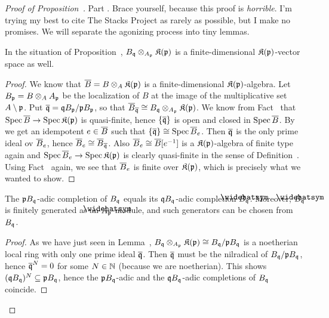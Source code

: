 \documentclass[a4paper,parskip=half,numbers=enddot, DIV=12]{scrreprt}
\begin{document}
\begin{proof}[Proof of Proposition~]
	Part . Brace yourself, because this proof is \emph{horrible}. I'm trying my best to cite The Stacks Project as rarely as possible, but I make no promises. We will separate the agonizing process into tiny lemmas.
	\begin{lem}
		In the situation of Proposition~, $B_{\mathfrak{q}}\otimes_{A_{\mathfrak{p}}}\mathfrak{K}(\mathfrak{p})$ is a finite-dimensional $\mathfrak{K}(\mathfrak{p})$-vector space as well.
	\end{lem}
	\begin{proof}
		We know that $\overline{B}=B\otimes_A\mathfrak{K}(\mathfrak{p})$ is a finite-dimensional $\mathfrak{K}(\mathfrak{p})$-algebra. Let $B_{\mathfrak{p}}=B\otimes_AA_{\mathfrak{p}}$ be the localization of $B$ at the image of the multiplicative set $A\setminus \mathfrak{p}$. Put $\overline{\mathfrak{q}}=\mathfrak{q} B_{\mathfrak{p}}/\mathfrak{p} B_{\mathfrak{p}}$, so that $\overline{B}_{\overline{\mathfrak{q}}}\cong B_{\mathfrak{q}}\otimes_{A_{\mathfrak{p}}}\mathfrak{K}(\mathfrak{p})$. We know from Fact~ that $\Spec\ov{B}\morphism\Spec \KK(\pp)$ is quasi-finite, hence $\left\{\overline{\mathfrak{q}}\right\}$ is open and closed in $\operatorname{Spec}\overline{B}$. By \cite[]{stacks-project} we get an idempotent $e\in \overline{B}$ such that $\left\{\overline{\mathfrak{q}}\right\}\cong \operatorname{Spec} \overline{B}_e$. Then $\overline{\mathfrak{q}}$ is the only prime ideal ov $\overline{B}_e$, hence $\overline{B}_e\cong \overline{B}_{\overline{\mathfrak{q}}}$. Also $\overline{B}_e\cong \overline{B}[e^{-1}]$ is a $\mathfrak{K}(\mathfrak{p})$-algebra of finite type again and $\Spec \ov{B}_e\morphism \Spec \KK(\pp)$ is clearly quasi-finite in the sense of Definition~. Using Fact~ again, we see that $\overline{B}_e$ is finite over $\mathfrak{K}(\mathfrak{p})$, which is precisely what we wanted to show.
	\end{proof}
	\begin{lem}
		The $\mathfrak{p} B_{\mathfrak{q}}$-adic completion of $B_{\mathfrak{q}}$ equals its $\mathfrak{q} B_{\mathfrak{q}}$-adic completion $\roof{B}_\qq$. Moreover, $\roof{B}_\qq$ is finitely generated as an $\roof{A}_\pp$-module, and such generators can be chosen from $B_{\mathfrak{q}}$.
	\end{lem}
	\begin{proof}
		As we have just seen in Lemma~, $B_{\mathfrak{q}}\otimes_{A_{\mathfrak{p}}}\mathfrak{K}(\mathfrak{p})\cong B_{\mathfrak{q}}/\mathfrak{p} B_{\mathfrak{q}}$ is a noetherian local ring with only one prime ideal $\overline{\mathfrak{q}}$. Then $\overline{\mathfrak{q}}$ must be the nilradical of $B_{\mathfrak{q}}/\mathfrak{p} B_{\mathfrak{q}}$, hence $\overline{\mathfrak{q}}^N=0$ for some $N\in\mathbb{N}$ (because we are noetherian). This shows $(\mathfrak{q} B_{\mathfrak{q}})^N\subseteq \mathfrak{p} B_{\mathfrak{q}}$, hence the $\mathfrak{p} B_{\mathfrak{q}}$-adic and the $\mathfrak{q} B_{\mathfrak{q}}$-adic completions of $B_{\mathfrak{q}}$ coincide.
		

\end{proof}
\end{proof}
\end{document}
